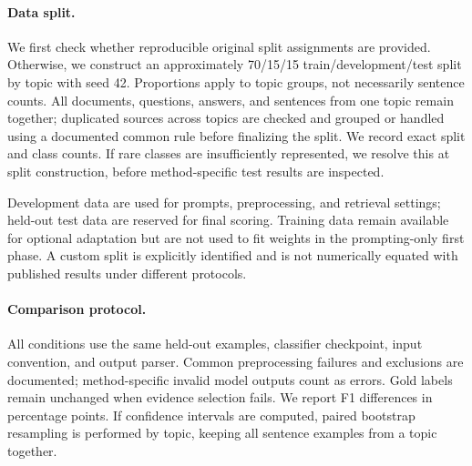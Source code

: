 \paragraph{Data split.}
We first check whether reproducible original split assignments are provided. Otherwise, we construct an approximately 70/15/15 train/development/test split by topic with seed 42. Proportions apply to topic groups, not necessarily sentence counts. All documents, questions, answers, and sentences from one topic remain together; duplicated sources across topics are checked and grouped or handled using a documented common rule before finalizing the split. We record exact split and class counts. If rare classes are insufficiently represented, we resolve this at split construction, before method-specific test results are inspected.

Development data are used for prompts, preprocessing, and retrieval settings; held-out test data are reserved for final scoring. Training data remain available for optional adaptation but are not used to fit weights in the prompting-only first phase. A custom split is explicitly identified and is not numerically equated with published results under different protocols.

\paragraph{Comparison protocol.}
All conditions use the same held-out examples, classifier checkpoint, input convention, and output parser. Common preprocessing failures and exclusions are documented; method-specific invalid model outputs count as errors. Gold labels remain unchanged when evidence selection fails. We report F1 differences in percentage points. If confidence intervals are computed, paired bootstrap resampling is performed by topic, keeping all sentence examples from a topic together.
